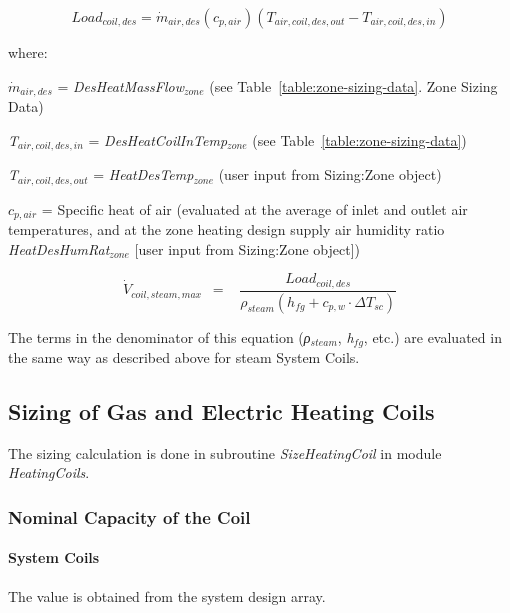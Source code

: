 \begin{equation}
Loa{d_{coil,des}} = {\dot m_{air,des}}({c_{p,air}})({T_{air,coil,des,out}} - {T_{air,coil,des,in}})
\end{equation}

where:

\({\dot m_{air,des}}\) = \emph{DesHeatMassFlow\(_{zone}\)} (see Table~\ref{table:zone-sizing-data}. Zone Sizing Data)

\emph{T\(_{air,coil,des,in}\)} = \emph{DesHeatCoilInTemp\(_{zone}\)} (see Table~\ref{table:zone-sizing-data})

\emph{T\(_{air,coil,des,out}\)} = \emph{HeatDesTemp\(_{zone}\)} (user input from Sizing:Zone object)

\({c_{p,air}}\) = Specific heat of air (evaluated at the average of inlet and outlet air temperatures, and at the zone heating design supply air humidity ratio \emph{HeatDesHumRat\(_{zone}\)} {[}user input from Sizing:Zone object{]})

\begin{equation}
{\dot V_{coil,steam,max}}\,\,\, = \,\,\,\,\,\frac{{Loa{d_{coil,des}}}}{{{\rho_{steam}}\left( {{h_{fg}} + {c_{p,w}}\cdot \Delta {T_{sc}}} \right)}}
\end{equation}

The terms in the denominator of this equation (\emph{ρ\(_{steam}\)}, \emph{h\(_{fg}\)}, etc.) are evaluated in the same way as described above for steam System Coils.

\subsection{Sizing of Gas and Electric Heating Coils}\label{sizing-of-gas-and-electric-heating-coils}

The sizing calculation is done in subroutine \emph{SizeHeatingCoil} in module \emph{HeatingCoils}.

\subsubsection{Nominal Capacity of the Coil}\label{nominal-capacity-of-the-coil}

\paragraph{System Coils}\label{system-coils-3}

The value is obtained from the system design array.

